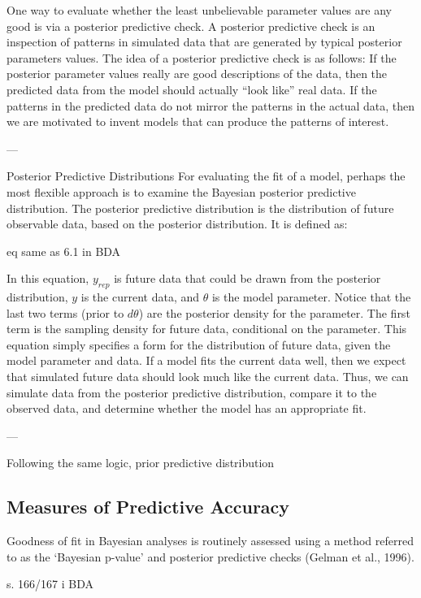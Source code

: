 One way to evaluate whether the least unbelievable parameter values are any good is via a posterior predictive check. A posterior predictive check is an inspection of patterns in simulated data that are generated by typical posterior parameters values. The idea of a posterior predictive check is as follows: If the posterior parameter values really are good descriptions of the data, then the predicted data from the model should actually “look like” real data. If the patterns in the predicted data do not mirror the patterns in the actual data, then we are motivated to invent models that can produce the patterns of interest.

---

Posterior Predictive Distributions
For evaluating the fit of a model, perhaps the most flexible approach is to examine the Bayesian posterior predictive distribution. The posterior predictive distribution is the distribution of future observable data, based on the posterior distribution. It is defined as: 

eq same as 6.1 in BDA 

In this equation, $y_{rep}$ is future data that could be drawn from the posterior distribution, $y$ is the current data, and $\theta$ is the model parameter. Notice that the last two terms (prior to $d\theta$) are the posterior density for the parameter. The first term is the sampling density for future data, conditional on the parameter. This equation simply specifies a form for the distribution of future data, given the model parameter and data. If a model fits the current data well, then we expect that simulated future data should look much like the current data. Thus, we can simulate data from the posterior predictive distribution, compare it to the observed data, and determine whether the model has an appropriate fit. 

---

Following the same logic, prior predictive distribution  


\subsection{Measures of Predictive Accuracy}

Goodness of fit in Bayesian analyses is routinely assessed using a method referred to as the ‘Bayesian p-value’ and posterior predictive checks (Gelman et al., 1996).

s. 166/167 i BDA 

